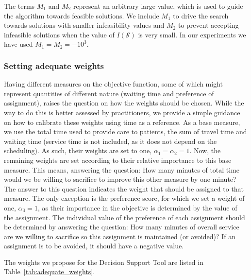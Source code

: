\documentclass[a4paper,11pt]{elsarticle}
\begin{document}
The terms $M_1$ and $M_2$ represent an arbitrary large value, which is used to guide the algorithm towards feasible solutions. We include $M_1$ to drive the search towards solutions with smaller infeasibility values and $M_2$ to prevent accepting infeasible solutions when the value of $I(\mathcal{S})$ is very small. In our experiments we have used $M_1 = M_2 = -10^3$.


\subsubsection{Setting adequate weights}\label{seq:adequate_weights}

Having different measures on the objective function, some of which might represent quantities of different nature (\eg waiting time and preference of assignment), raises the question on how the weights should be chosen. While the way to do this is better assessed by practitioners, we provide a simple guidance on how to calibrate these weights using time as a reference.
As a base measure, we use the total time used to provide care to patients, \ie the sum of travel time and waiting time (service time is not included, as it does not depend on the scheduling). As such, their weights are set to one, $\alpha_1 = \alpha_2 = 1$.
Now, the remaining weights are set according to their relative importance to this base measure. This means, answering the question: How many minutes of total time would we be willing to sacrifice to improve this other measure by one minute? The answer to this question indicates the weight that should be assigned to that measure.
The only exception is the preference score, for which we set a weight of one, $\alpha_3 = 1$, as their importance in the objective is determined by the value of the assignment. The individual value of the preference of each assignment should be determined by answering the question: How many minutes of overall service are we willing to sacrifice so this assignment is maintained (or avoided)? If an assignment is to be avoided, it should have a negative value.

The weights we propose for the Decision Support Tool are listed in Table~\ref{tab:adequate_weights}.
\end{document}
